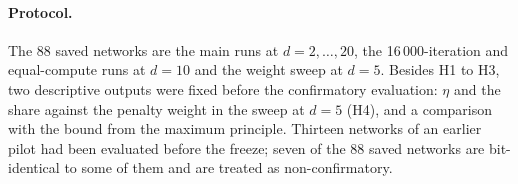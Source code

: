 \paragraph{Protocol.} The 88 saved networks are the main runs at $d=2,\dots,20$, the
16\,000-iteration and equal-compute runs at $d=10$ and the weight sweep at $d=5$. Besides H1 to
H3, two descriptive outputs were fixed before the confirmatory evaluation: $\eta$ and the share
against the penalty weight in the sweep at $d=5$ (H4), and a comparison with the bound from the
maximum principle. Thirteen networks of an earlier pilot had been evaluated before the freeze;
seven of the 88 saved networks are bit-identical to some of them and are treated as
non-confirmatory.

